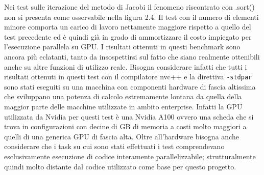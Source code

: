 \documentclass[12pt,a4paper]{report}
\begin{document}
\begin{figure}[H]
\centering
\begin{floatrow}[1]
\end{floatrow}
\end{figure} 

Nei test sulle iterazione del metodo di Jacobi il fenomeno riscontrato con .sort() non si presenta come osservabile nella figura 2.4. Il test con il numero di elementi minore comporta un carico di lavoro nettamente maggiore rispetto a quello del test precedente ed è quindi già in grado di ammortizzare il costo impiegato per l'esecuzione parallela su GPU.
I risultati ottenuti in questi benchmark sono ancora più eclatanti, tanto da insospettirsi sul fatto che siano realmente ottenibili anche su altre funzioni di utilizzo reale. \newline
Bisogna considerare infatti che tutti i risultati ottenuti in questi test con il compilatore nvc++ e la direttiva \verb|-stdpar| sono stati eseguiti su una macchina con componenti hardware di fascia altissima che sviluppano una potenza di calcolo estremamente lontana da quella della maggior parte delle macchine utilizzate in ambito enterprise. Infatti la GPU utilizzata da Nvidia per questi test è una Nvidia A100 ovvero una scheda che si trova in configurazioni con decine di GB di memoria a costi molto maggiori a quelli di una generica GPU di fascia alta. \newline
Oltre all'hardware bisogna anche considerare che i task su cui sono stati effettuati i test comprendevano esclusivamente esecuzione di codice interamente parallelizzabile; strutturalmente quindi molto distante dal codice utilizzato come base per questo progetto.
\end{document}
